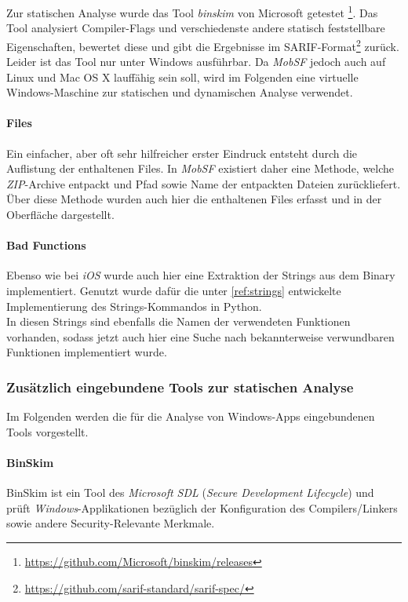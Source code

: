 Zur statischen Analyse wurde das Tool \textit{binskim} von Microsoft getestet \footnote{\url{https://github.com/Microsoft/binskim/releases}}. Das Tool analysiert Compiler-Flags und verschiedenste andere statisch feststellbare Eigenschaften, bewertet diese und gibt die Ergebnisse im SARIF-Format\footnote{\url{https://github.com/sarif-standard/sarif-spec/}} zurück. Leider ist das Tool nur unter Windows ausführbar. Da \textit{MobSF} jedoch auch auf Linux und Mac OS X lauffähig sein soll, wird im Folgenden eine virtuelle Windows-Maschine zur statischen und dynamischen Analyse verwendet.


\paragraph{Files}
Ein einfacher, aber oft sehr hilfreicher erster Eindruck entsteht durch die Auflistung der enthaltenen Files. In \textit{MobSF} existiert daher eine Methode, welche \textit{ZIP}-Archive entpackt und Pfad sowie Name der entpackten Dateien zurückliefert. Über diese Methode wurden auch hier die enthaltenen Files erfasst und in der Oberfläche dargestellt.

\paragraph{Bad Functions}\label{ref:WeitEntwWinBadFunc}
Ebenso wie bei \textit{iOS} wurde auch hier eine Extraktion der Strings aus dem Binary implementiert. Genutzt wurde dafür die unter \ref{ref:strings} entwickelte Implementierung des Strings-Kommandos in Python.\\

In diesen Strings sind ebenfalls die Namen der verwendeten Funktionen vorhanden, sodass jetzt auch hier eine Suche nach bekannterweise verwundbaren Funktionen implementiert wurde.

\newpage
\subsubsection{Zusätzlich eingebundene Tools zur statischen Analyse}\label{ref:WeitMobEingTools}
Im Folgenden werden die für die Analyse von Windows-Apps eingebundenen Tools vorgestellt.

\paragraph{BinSkim}
BinSkim ist ein Tool des \textit{Microsoft SDL} (\textit{Secure Development Lifecycle}) und prüft \textit{Windows}-Applikationen bezüglich der Konfiguration des Compilers/Linkers sowie andere Security-Relevante Merkmale.\cite{BinSkimGithub}\\

